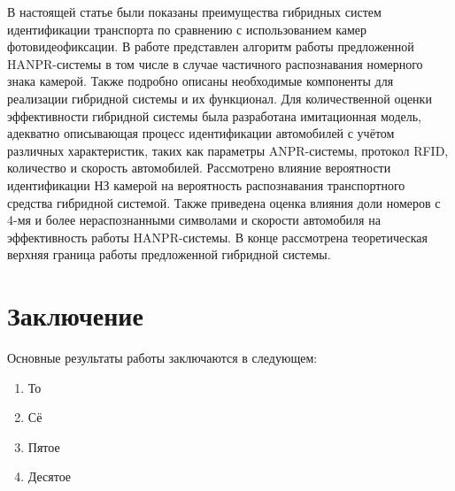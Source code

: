 \documentclass[12pt]{article}
\theoremstyle{definition}
\begin{document}
В настоящей статье были показаны преимущества гибридных систем идентификации транспорта по сравнению с использованием камер фотовидеофиксации. В работе представлен алгоритм работы предложенной HANPR-системы в том числе в случае частичного распознавания номерного знака камерой. Также подробно описаны необходимые компоненты для реализации гибридной системы и их функционал. Для количественной оценки эффективности гибридной системы была разработана имитационная модель, адекватно описывающая процесс идентификации автомобилей с учётом различных характеристик, таких как параметры ANPR-системы, протокол RFID, количество и скорость автомобилей. Рассмотрено влияние вероятности идентификации НЗ камерой на вероятность распознавания транспортного средства гибридной системой. Также приведена оценка влияния доли номеров с 4-мя и более нераспознанными символами и скорости автомобиля на эффективность работы HANPR-системы. В конце рассмотрена теоретическая верхняя граница работы предложенной гибридной системы.


\section*{Заключение}
Основные результаты работы заключаются в следующем:

\begin{enumerate}
    \item То
    \item Сё
    \item Пятое
    \item Десятое
\end{enumerate}

\setlength{\itemsep}{0em}
\small

\end{document}
